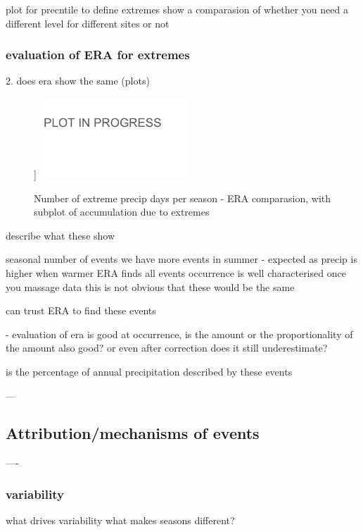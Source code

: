 \documentclass[draft]{agujournal2019}
\begin{document}
plot for precntile to define extremes
 show a comparasion of whether you need a different level for different sites or not

\subsubsection{evaluation of ERA for extremes}
 
2. does era show the same (plots)

\begin{figure}[h!tbp]]
\noindent\includegraphics[width=0.5\textwidth]{figures/plot_in_progress.png}
\caption{Number of extreme precip days per season - ERA comparasion, with subplot of accumulation due to extremes}
\end{figure}



describe what these show


seasonal number of events
we have more events in summer - expected as precip is higher when warmer
ERA finds all events 
occurrence is well characterised once you massage data
this is not obvious that these would be the same

can trust ERA to find these events


- evaluation of era is good at occurrence, is the amount or the proportionality of the amount also good?
or even after correction does it still underestimate?

is the percentage of annual precipitation described by these events



--- 

\subsection{Attribution/mechanisms of events}


----
\subsubsection{variability}
what drives variability 
what makes seasons different?
\end{document}
